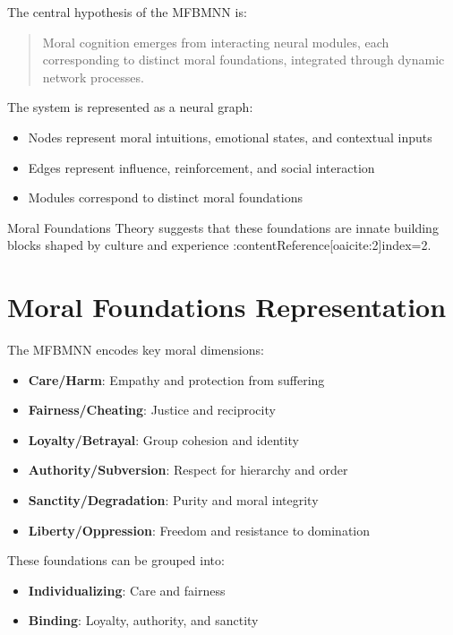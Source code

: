 \documentclass[12pt]{article}
\begin{document}
The central hypothesis of the MFBMNN is:

\begin{quote}
Moral cognition emerges from interacting neural modules, each corresponding to distinct moral foundations, integrated through dynamic network processes.
\end{quote}

The system is represented as a neural graph:

\begin{itemize}
\item Nodes represent moral intuitions, emotional states, and contextual inputs
\item Edges represent influence, reinforcement, and social interaction
\item Modules correspond to distinct moral foundations
\end{itemize}

Moral Foundations Theory suggests that these foundations are innate building blocks shaped by culture and experience :contentReference[oaicite:2]{index=2}.

\section{Moral Foundations Representation}

The MFBMNN encodes key moral dimensions:

\begin{itemize}
\item \textbf{Care/Harm}: Empathy and protection from suffering
\item \textbf{Fairness/Cheating}: Justice and reciprocity
\item \textbf{Loyalty/Betrayal}: Group cohesion and identity
\item \textbf{Authority/Subversion}: Respect for hierarchy and order
\item \textbf{Sanctity/Degradation}: Purity and moral integrity
\item \textbf{Liberty/Oppression}: Freedom and resistance to domination
\end{itemize}

These foundations can be grouped into:
\begin{itemize}
\item \textbf{Individualizing}: Care and fairness
\item \textbf{Binding}: Loyalty, authority, and sanctity
\end{itemize}
\end{document}
